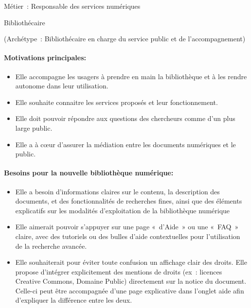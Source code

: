 Métier : Responsable des services numériques

Bibliothécaire

(Archétype : Bibliothécaire en charge du service public et de l’accompagnement)

\paragraph*{Motivations principales:}
\begin{itemize}
	\item Elle accompagne les usagers à prendre en main la bibliothèque et à les rendre autonome dans leur utilisation.
\item Elle souhaite connaitre les services proposés et leur fonctionnement.
\item Elle doit pouvoir répondre aux questions des chercheurs comme d’un plus large public.
\item Elle a à cœur d’assurer la médiation entre les documents numériques et le public.
\end{itemize}

\paragraph*{Besoins pour la nouvelle bibliothèque numérique:}
\begin{itemize}
	\item Elle a besoin d’informations claires sur le contenu, la description des documents, et des fonctionnalités de recherches fines, ainsi que des éléments explicatifs sur les modalités d’exploitation de la bibliothèque numérique
\item Elle aimerait pouvoir s’appuyer sur une page « d’Aide » ou une « FAQ » claire, avec des tutoriels ou des bulles d’aide contextuelles pour l’utilisation de la recherche avancée.
\item Elle souhaiterait pour éviter toute confusion un affichage clair des droits. Elle propose d’intégrer explicitement des mentions de droits (ex : licences Creative Commons, Domaine Public) directement sur la notice du document. Celle-ci peut être accompagnée d’une page explicative dans l’onglet aide afin d’expliquer la différence entre les deux.
\end{itemize}


